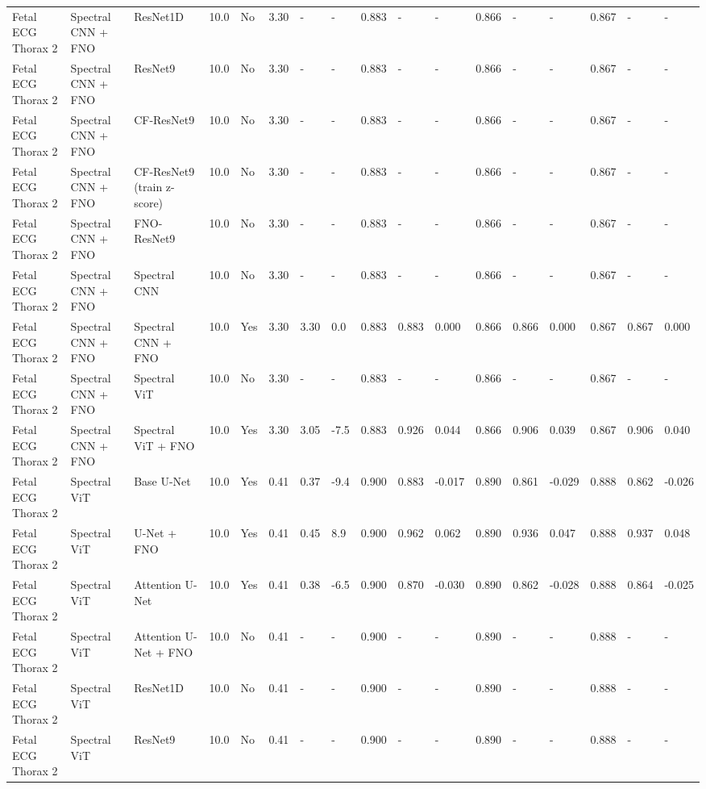 \begin{longtable}{lllllllllllllllll}
Fetal ECG Thorax 2 & Spectral CNN + FNO & ResNet1D & 10.0 & No & 3.30 & - & - & 0.883 & - & - & 0.866 & - & - & 0.867 & - & - \\
Fetal ECG Thorax 2 & Spectral CNN + FNO & ResNet9 & 10.0 & No & 3.30 & - & - & 0.883 & - & - & 0.866 & - & - & 0.867 & - & - \\
Fetal ECG Thorax 2 & Spectral CNN + FNO & CF-ResNet9 & 10.0 & No & 3.30 & - & - & 0.883 & - & - & 0.866 & - & - & 0.867 & - & - \\
Fetal ECG Thorax 2 & Spectral CNN + FNO & CF-ResNet9 (train z-score) & 10.0 & No & 3.30 & - & - & 0.883 & - & - & 0.866 & - & - & 0.867 & - & - \\
Fetal ECG Thorax 2 & Spectral CNN + FNO & FNO-ResNet9 & 10.0 & No & 3.30 & - & - & 0.883 & - & - & 0.866 & - & - & 0.867 & - & - \\
Fetal ECG Thorax 2 & Spectral CNN + FNO & Spectral CNN & 10.0 & No & 3.30 & - & - & 0.883 & - & - & 0.866 & - & - & 0.867 & - & - \\
Fetal ECG Thorax 2 & Spectral CNN + FNO & Spectral CNN + FNO & 10.0 & Yes & 3.30 & 3.30 & 0.0 & 0.883 & 0.883 & 0.000 & 0.866 & 0.866 & 0.000 & 0.867 & 0.867 & 0.000 \\
Fetal ECG Thorax 2 & Spectral CNN + FNO & Spectral ViT & 10.0 & No & 3.30 & - & - & 0.883 & - & - & 0.866 & - & - & 0.867 & - & - \\
Fetal ECG Thorax 2 & Spectral CNN + FNO & Spectral ViT + FNO & 10.0 & Yes & 3.30 & 3.05 & -7.5 & 0.883 & 0.926 & 0.044 & 0.866 & 0.906 & 0.039 & 0.867 & 0.906 & 0.040 \\
Fetal ECG Thorax 2 & Spectral ViT & Base U-Net & 10.0 & Yes & 0.41 & 0.37 & -9.4 & 0.900 & 0.883 & -0.017 & 0.890 & 0.861 & -0.029 & 0.888 & 0.862 & -0.026 \\
Fetal ECG Thorax 2 & Spectral ViT & U-Net + FNO & 10.0 & Yes & 0.41 & 0.45 & 8.9 & 0.900 & 0.962 & 0.062 & 0.890 & 0.936 & 0.047 & 0.888 & 0.937 & 0.048 \\
Fetal ECG Thorax 2 & Spectral ViT & Attention U-Net & 10.0 & Yes & 0.41 & 0.38 & -6.5 & 0.900 & 0.870 & -0.030 & 0.890 & 0.862 & -0.028 & 0.888 & 0.864 & -0.025 \\
Fetal ECG Thorax 2 & Spectral ViT & Attention U-Net + FNO & 10.0 & No & 0.41 & - & - & 0.900 & - & - & 0.890 & - & - & 0.888 & - & - \\
Fetal ECG Thorax 2 & Spectral ViT & ResNet1D & 10.0 & No & 0.41 & - & - & 0.900 & - & - & 0.890 & - & - & 0.888 & - & - \\
Fetal ECG Thorax 2 & Spectral ViT & ResNet9 & 10.0 & No & 0.41 & - & - & 0.900 & - & - & 0.890 & - & - & 0.888 & - & - \\

\end{longtable}
